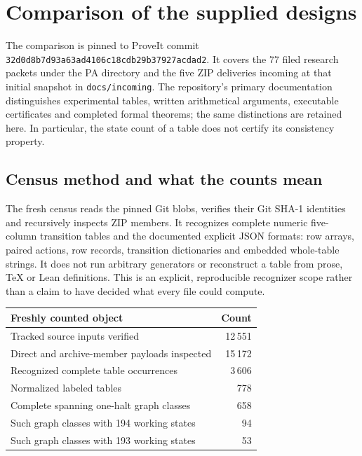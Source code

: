 \section{Comparison of the supplied designs}
\label{sec:corpus-comparison}

The comparison is pinned to ProveIt commit
\texttt{32d0d8b7d93a63ad4106c18cdb29b37927acdad2}.
It covers the 77 filed research packets under the PA directory and the five
ZIP deliveries incoming at that initial snapshot in \nolinkurl{docs/incoming}. The repository's
primary documentation distinguishes experimental tables, written
arithmetical arguments, executable certificates and completed formal
theorems; the same distinctions are retained here. In particular, the
state count of a table does not certify its consistency property.
\cite{pa-readme,machines}

\subsection{Census method and what the counts mean}

The fresh census reads the pinned Git blobs, verifies their Git SHA-1
identities and recursively inspects ZIP members. It recognizes complete
numeric five-column transition tables and the documented explicit JSON
formats: row arrays, paired actions, row records, transition dictionaries
and embedded whole-table strings. It does not run arbitrary generators
or reconstruct a table from prose, TeX or Lean definitions. This is an
explicit, reproducible recognizer scope rather than a claim to have
decided what every file could compute.

\begin{center}
\begin{tabular}{@{}lr@{}}
\toprule
Freshly counted object & Count\\
\midrule
Tracked source inputs verified & 12\,551\\
Direct and archive-member payloads inspected & 15\,172\\
Recognized complete table occurrences & 3\,606\\
Normalized labeled tables & 778\\
Complete spanning one-halt graph classes & 658\\
Such graph classes with 194 working states & 94\\
Such graph classes with 193 working states & 53\\
\bottomrule
\end{tabular}
\end{center}

